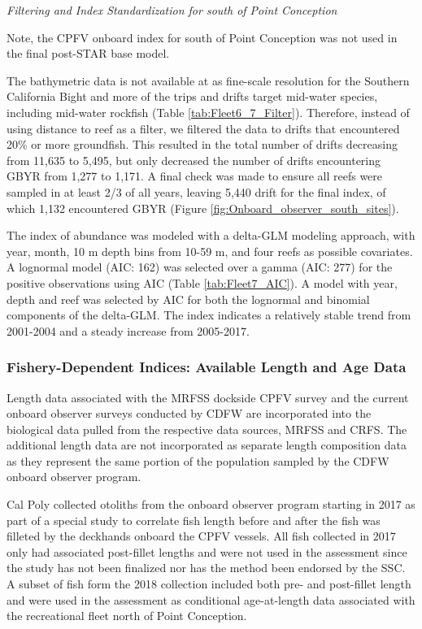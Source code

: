 \documentclass[12pt,]{article}
\begin{document}
\emph{Filtering and Index Standardization for south of Point Conception}

Note, the CPFV onboard index for south of Point Conception was not used
in the final post-STAR base model.

The bathymetric data is not available at as fine-scale resolution for
the Southern California Bight and more of the trips and drifts target
mid-water species, including mid-water rockfish (Table
\ref{tab:Fleet6_7_Filter}). Therefore, instead of using distance to reef
as a filter, we filtered the data to drifts that encountered 20\% or
more groundfish. This resulted in the total number of drifts decreasing
from 11,635 to 5,495, but only decreased the number of drifts
encountering GBYR from 1,277 to 1,171. A final check was made to ensure
all reefs were sampled in at least 2/3 of all years, leaving 5,440 drift
for the final index, of which 1,132 encountered GBYR (Figure
\ref{fig:Onboard_observer_south_sites}).

The index of abundance was modeled with a delta-GLM modeling approach,
with year, month, 10 m depth bins from 10-59 m, and four reefs as
possible covariates. A lognormal model (AIC: 162) was selected over a
gamma (AIC: 277) for the positive observations using AIC (Table
\ref{tab:Fleet7_AIC}). A model with year, depth and reef was selected by
AIC for both the lognormal and binomial components of the delta-GLM. The
index indicates a relatively stable trend from 2001-2004 and a steady
increase from 2005-2017.

\subsubsection{Fishery-Dependent Indices: Available Length and Age
Data}\label{fishery-dependent-indices-available-length-and-age-data}

Length data associated with the MRFSS dockside CPFV survey and the
current onboard observer surveys conducted by CDFW are incorporated into
the biological data pulled from the respective data sources, MRFSS and
CRFS. The additional length data are not incorporated as separate length
composition data as they represent the same portion of the population
sampled by the CDFW onboard observer program.

Cal Poly collected otoliths from the onboard observer program starting
in 2017 as part of a special study to correlate fish length before and
after the fish was filleted by the deckhands onboard the CPFV vessels.
All fish collected in 2017 only had associated post-fillet lengths and
were not used in the assessment since the study has not been finalized
nor has the method been endorsed by the SSC. A subset of fish form the
2018 collection included both pre- and post-fillet length and were used
in the assessment as conditional age-at-length data associated with the
recreational fleet north of Point Conception.
\end{document}
